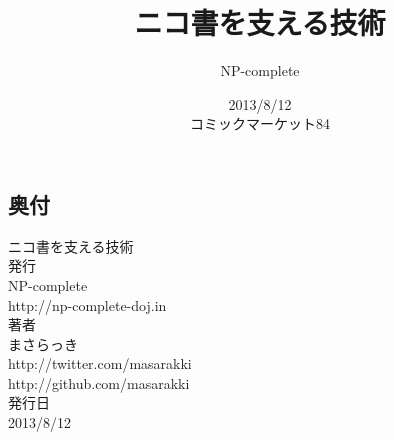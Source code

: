 \documentclass{jarticle}
\title{ニコ書を支える技術}
\author{NP-complete}
\date{2013/8/12\\コミックマーケット84}
\begin{document}
\Huge
\maketitle
\normalsize
\thispagestyle{empty}
\newpage
\thispagestyle{empty}
\-
\newpage


\newpage


\newpage


\newpage


\newpage


\newpage


\newpage


\newpage


\newpage


\newpage


\newpage

\newpage

\newpage

\begin{center}
  \Large
  \section*{奥付}
           {\huge ニコ書を支える技術}
           \\[2.0cm]
           発行\\
           NP-complete\\
           http://np-complete-doj.in
           \\[1.5cm]
           著者\\
           まさらっき\\
           http://twitter.com/masarakki\\
           http://github.com/masarakki
           \\[2.5cm]
           発行日\\
           2013/8/12
\end{center}
\newpage
\thispagestyle{empty}
\-
\newpage
\begin{flushright}
  \-
\end{flushright}

\thispagestyle{empty}
\end{document}
